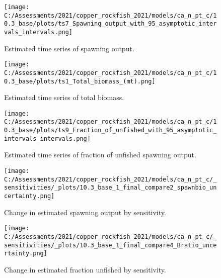 \documentclass[11pt,
  english,
  a4paper,
]{article}
\begin{document}
\begin{figure}
\centering
\texttt{[image: C:/Assessments/2021/copper\_rockfish\_2021/models/ca\_n\_pt\_c/10.3\_base/plots/ts7\_Spawning\_output\_with\_95\_asymptotic\_intervals\_intervals.png]}
\caption{Estimated time series of spawning output.\label{fig:ssb}}
\end{figure}

\tagmcend\tagstructend


\begin{figure}
\centering
\texttt{[image: C:/Assessments/2021/copper\_rockfish\_2021/models/ca\_n\_pt\_c/10.3\_base/plots/ts1\_Total\_biomass\_(mt).png]}
\caption{Estimated time series of total biomass.\label{fig:tot-bio}}
\end{figure}

\tagmcend\tagstructend


\begin{figure}
\centering
\texttt{[image: C:/Assessments/2021/copper\_rockfish\_2021/models/ca\_n\_pt\_c/10.3\_base/plots/ts9\_Fraction\_of\_unfished\_with\_95\_asymptotic\_intervals\_intervals.png]}
\caption{Estimated time series of fraction of unfished spawning output.\label{fig:depl}}
\end{figure}

\tagmcend\tagstructend


\begin{figure}
\centering
\texttt{[image: C:/Assessments/2021/copper\_rockfish\_2021/models/ca\_n\_pt\_c/\_sensitivities/\_plots/10.3\_base\_1\_final\_compare2\_spawnbio\_uncertainty.png]}
\caption{Change in estimated spawning output by sensitivity.\label{fig:sens-ssb-1}}
\end{figure}

\tagmcend\tagstructend


\begin{figure}
\centering
\texttt{[image: C:/Assessments/2021/copper\_rockfish\_2021/models/ca\_n\_pt\_c/\_sensitivities/\_plots/10.3\_base\_1\_final\_compare4\_Bratio\_uncertainty.png]}
\caption{Change in estimated fraction unfished by sensitivity.\label{fig:sens-depl-1}}
\end{figure}
\end{document}
